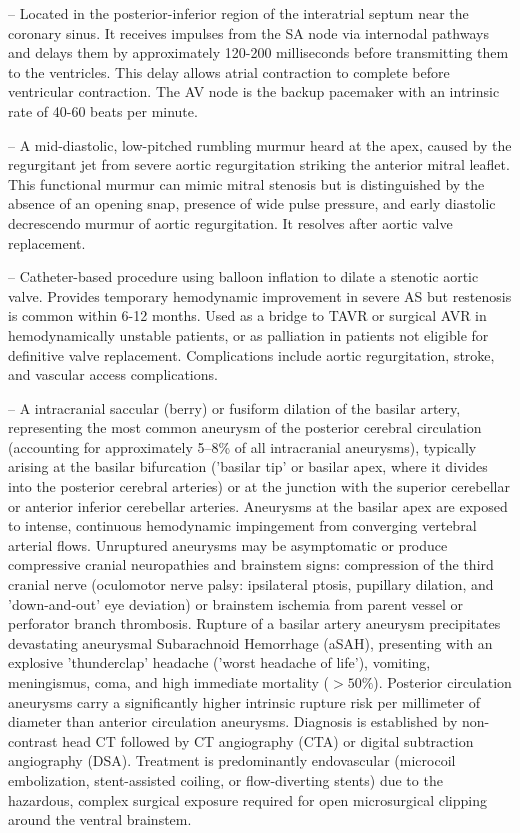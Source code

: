 -- Located in the posterior-inferior region of the interatrial septum near the coronary sinus. It receives impulses from the SA node via internodal pathways and delays them by approximately 120-200 milliseconds before transmitting them to the ventricles. This delay allows atrial contraction to complete before ventricular contraction. The AV node is the backup pacemaker with an intrinsic rate of 40-60 beats per minute.

-- A mid-diastolic, low-pitched rumbling murmur heard at the apex, caused by the regurgitant jet from severe aortic regurgitation striking the anterior mitral leaflet. This functional murmur can mimic mitral stenosis but is distinguished by the absence of an opening snap, presence of wide pulse pressure, and early diastolic decrescendo murmur of aortic regurgitation. It resolves after aortic valve replacement.

-- Catheter-based procedure using balloon inflation to dilate a stenotic aortic valve. Provides temporary hemodynamic improvement in severe AS but restenosis is common within 6-12 months. Used as a bridge to TAVR or surgical AVR in hemodynamically unstable patients, or as palliation in patients not eligible for definitive valve replacement. Complications include aortic regurgitation, stroke, and vascular access complications.

-- A intracranial saccular (berry) or fusiform dilation of the basilar artery, representing the most common aneurysm of the posterior cerebral circulation (accounting for approximately 5--8\% of all intracranial aneurysms), typically arising at the basilar bifurcation ('basilar tip' or basilar apex, where it divides into the posterior cerebral arteries) or at the junction with the superior cerebellar or anterior inferior cerebellar arteries. Aneurysms at the basilar apex are exposed to intense, continuous hemodynamic impingement from converging vertebral arterial flows. Unruptured aneurysms may be asymptomatic or produce compressive cranial neuropathies and brainstem signs: compression of the third cranial nerve (oculomotor nerve palsy: ipsilateral ptosis, pupillary dilation, and 'down-and-out' eye deviation) or brainstem ischemia from parent vessel or perforator branch thrombosis. Rupture of a basilar artery aneurysm precipitates devastating aneurysmal Subarachnoid Hemorrhage (aSAH), presenting with an explosive 'thunderclap' headache ('worst headache of life'), vomiting, meningismus, coma, and high immediate mortality ($>50\%$). Posterior circulation aneurysms carry a significantly higher intrinsic rupture risk per millimeter of diameter than anterior circulation aneurysms. Diagnosis is established by non-contrast head CT followed by CT angiography (CTA) or digital subtraction angiography (DSA). Treatment is predominantly endovascular (microcoil embolization, stent-assisted coiling, or flow-diverting stents) due to the hazardous, complex surgical exposure required for open microsurgical clipping around the ventral brainstem.

